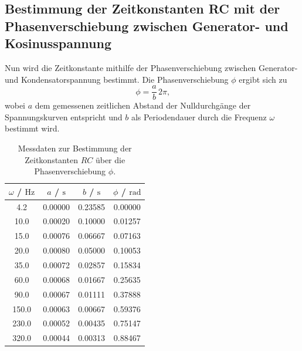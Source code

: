 \subsection{Bestimmung der Zeitkonstanten RC mit der Phasenverschiebung zwischen Generator- und Kosinusspannung}

Nun wird die Zeitkonstante mithilfe der Phasenverschiebung zwischen Generator- und Kondensatorspannung bestimmt.
Die Phasenverschiebung $\phi$ ergibt sich zu
\begin{equation*}
	\phi = \frac{a}{b} \, 2\pi \text{,}
\end{equation*}
wobei $a$ dem gemessenen zeitlichen Abstand der Nulldurchgänge der Spannungskurven entspricht und $b$ als Periodendauer durch die Frequenz $\omega$ bestimmt wird.

\begin{table}
	\caption{Messdaten zur Bestimmung der Zeitkonstanten $RC$ über die Phasenverschiebung $\phi$.}
	\label{tab:phasen}
	\centering
	\begin{tabular}{cccc}
		\toprule
		$\omega$ / $\si{\Hz}$ & $a$ / $\si{\second}$ & $b$ / $\si{\second}$ & $\phi$ / $\si{\radian}$ \\
		\midrule
		4.2                   & 0.00000              & 0.23585              & 0.00000                 \\
		10.0                  & 0.00020              & 0.10000              & 0.01257                 \\
		15.0                  & 0.00076              & 0.06667              & 0.07163                 \\
		20.0                  & 0.00080              & 0.05000              & 0.10053                 \\
		35.0                  & 0.00072              & 0.02857              & 0.15834                 \\
		60.0                  & 0.00068              & 0.01667              & 0.25635                 \\
		90.0                  & 0.00067              & 0.01111              & 0.37888                 \\
		150.0                 & 0.00063              & 0.00667              & 0.59376                 \\
		230.0                 & 0.00052              & 0.00435              & 0.75147                 \\
		320.0                 & 0.00044              & 0.00313              & 0.88467                 \\

\end{tabular}
\end{table}
